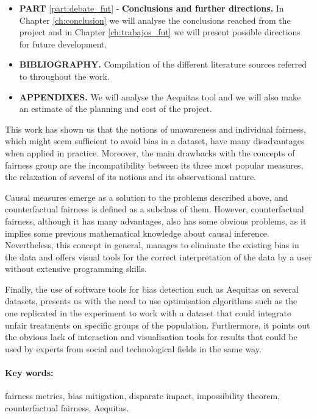 \begin{itemize}
    \item \textbf{PART} \ref{part:debate_fut} - \textbf{Conclusions and further directions.} In Chapter \ref{ch:conclusion} we will analyse the conclusions reached from the project and in Chapter \ref{ch:trabajos_fut} we will present possible directions for future development.
    \item \textbf{BIBLIOGRAPHY.} Compilation of the different literature sources referred to throughout the work.
    \item \textbf{APPENDIXES.} We will analyse the Aequitas tool and we will also make an estimate of the planning and cost of the project.
\end{itemize}

This work has shown us that the notions of unawareness and individual fairness, which might seem sufficient to avoid bias in a dataset, have many disadvantages when applied in practice. Moreover, the main drawbacks with the concepts of fairness group are the incompatibility between its three most popular measures, the relaxation of several of its notions and its observational nature.

Causal measures emerge as a solution to the problems described above, and counterfactual fairness is defined as a subclass of them. However, counterfactual fairness, although it has many advantages, also has some obvious problems, as it implies some previous mathematical knowledge about causal inference. Nevertheless, this concept in general, manages to eliminate the existing bias in the data and offers visual tools for the correct interpretation of the data by a user without extensive programming skills.

Finally, the use of software tools for bias detection such as Aequitas on several datasets, presents us with the need to use optimisation algorithms such as the one replicated in the experiment to work with a dataset that could integrate unfair treatments on specific groups of the population. Furthermore, it points out the obvious lack of interaction and visualisation tools for results that could be used by experts from social and technological fields in the same way.

\paragraph{Key words:} fairness metrics, bias mitigation, disparate impact,  impossibility theorem, counterfactual fairness, Aequitas.